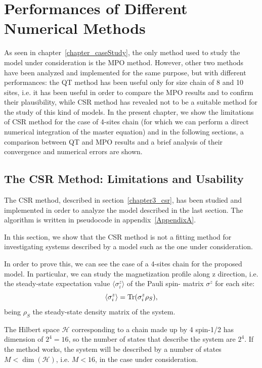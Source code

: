 \chapter{Performances of Different Numerical Methods}
\label{chapterPerformances}
As seen in chapter~\ref{chapter_caseStudy}, the only method used to study the model under consideration is the MPO method. However, other two methods have been analyzed and implemented for the same purpose, but with different performances: the QT method has been useful only for size chain of 8 and 10 sites, i.e. it has been useful in order to compare the MPO results and to confirm their plausibility, while CSR method has revealed not to be a suitable method for the study of this kind of models. In the present chapter, we show the limitations of CSR method for the case of 4-sites chain (for which we can perform a direct numerical integration of the master equation) and in the following sections, a comparison between QT and MPO results and a brief analysis of their convergence and numerical errors are shown.

\section{The CSR Method: Limitations and Usability}
The CSR method, described in section~\ref{chapter3_csr}, has been studied and implemented in order to analyze the model described in the last section. The algorithm is written in pseudocode in appendix~\ref{AppendixA}.

In this section, we show that the CSR method is not a fitting method for investigating systems described by a model such as the one under consideration.

In order to prove this, we can see the case of a 4-sites chain for the proposed model. In particular, we can study the magnetization profile along z direction, i.e. the steady-state expectation value $\langle \sigma_i^z \rangle$ of the Pauli spin- matrix $\sigma^z$ for each site:
\begin{equation*}
    \langle \sigma_i^z \rangle = \operatorname{Tr}(\sigma_i^z \rho_S),
\end{equation*}
being $\rho_S$ the steady-state density matrix of the system.

The Hilbert space $\mathcal{H}$ corresponding to a chain made up by 4 spin-1/2 has dimension of $2^{4} = 16$, so the number of states that describe the system are $2^4$. If the method works, the system will be described by a number of states $M < \dim(\mathcal{H})$, i.e. $M < 16$, in the case under consideration.

